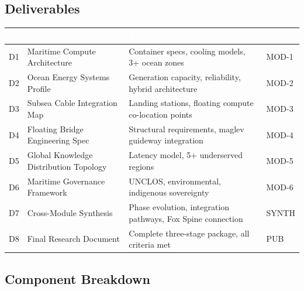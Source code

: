 \documentclass[11pt,letterpaper]{article}
\newcommand{\tableheader}[1]{\textbf{\sffamily\textcolor{white}{#1}}}
\begin{document}
\subsection{Deliverables}

\begin{center}
\begin{tabularx}{\textwidth}{C{0.8cm}L{4cm}XC{1.5cm}}
\toprule
{}
\tableheader{\#} & \tableheader{Deliverable} & \tableheader{Acceptance Criteria} & \tableheader{Spec} \\
\midrule
D1 & Maritime Compute Architecture & Container specs, cooling models, 3+ ocean zones & MOD-1 \\
D2 & Ocean Energy Systems Profile & Generation capacity, reliability, hybrid architecture & MOD-2 \\
D3 & Subsea Cable Integration Map & Landing stations, floating compute co-location points & MOD-3 \\
D4 & Floating Bridge Engineering Spec & Structural requirements, maglev guideway integration & MOD-4 \\
D5 & Global Knowledge Distribution Topology & Latency model, 5+ underserved regions & MOD-5 \\
D6 & Maritime Governance Framework & UNCLOS, environmental, indigenous sovereignty & MOD-6 \\
D7 & Cross-Module Synthesis & Phase evolution, integration pathways, Fox Spine connection & SYNTH \\
D8 & Final Research Document & Complete three-stage package, all criteria met & PUB \\
\bottomrule
\end{tabularx}
\end{center}

\subsection{Component Breakdown}
\end{document}
